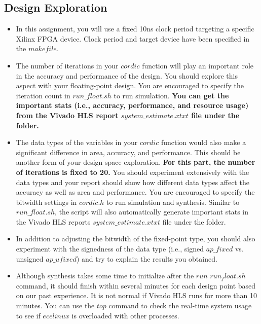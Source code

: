 \documentclass[paper=letter, fontsize=11.6pt]{scrartcl} %
\numberwithin{equation}{section} %
\numberwithin{figure}{section} %
\numberwithin{table}{section} %
\begin{document}
\subsection{Design Exploration}
   \begin{itemize}
   	
	\item In this assignment, you will use a fixed 10ns clock period targeting a specific Xilinx FPGA device. Clock period and target device have been specified in the $makefile$.

\item The number of iterations in your $cordic$ function will play an important role in the accuracy and performance of the design. You should explore this aspect with your floating-point design. You are encouraged to specify the iteration count in $run\_float.sh$ to run  simulation. \textbf{You can get the  important stats (i.e., accuracy, performance, and resource usage) from the Vivado HLS report $system\_estimate.xtxt$ file under the folder.} 

	\item The data types of the variables in your $cordic$ function would also make a significant difference in area, accuracy, and performance. This should be another form of your design space exploration. \textbf{For this part, the number of iterations is fixed to 20.} You should experiment extensively with the data types and your report should show how different data types affect the accuracy as well as area and performance. You are encouraged to specify the bitwidth
    settings in $cordic.h$ to run simulation and synthesis. Similar to $run\_float.sh$, the script will also automatically generate important stats in the Vivado HLS reports $system\_estimate.xtxt$ file under the folder.

    \item In addition to adjusting the bitwidth of the fixed-point type, you should also experiment with the signedness of the data type (i.e., signed $ap\_fixed$ vs. unsigned $ap\_ufixed$) and try to explain the results you obtained.  


    \item Although synthesis takes some time to initialize after the $run$ $run_float.sh$ command, it should finish within several minutes for each design point based on our past experience. It is not normal if Vivado HLS runs for more than 10 minutes. You can use the $top$ command to check the real-time system usage to see if $ecelinux$ is overloaded with other processes.


\end{itemize}
\end{document}
